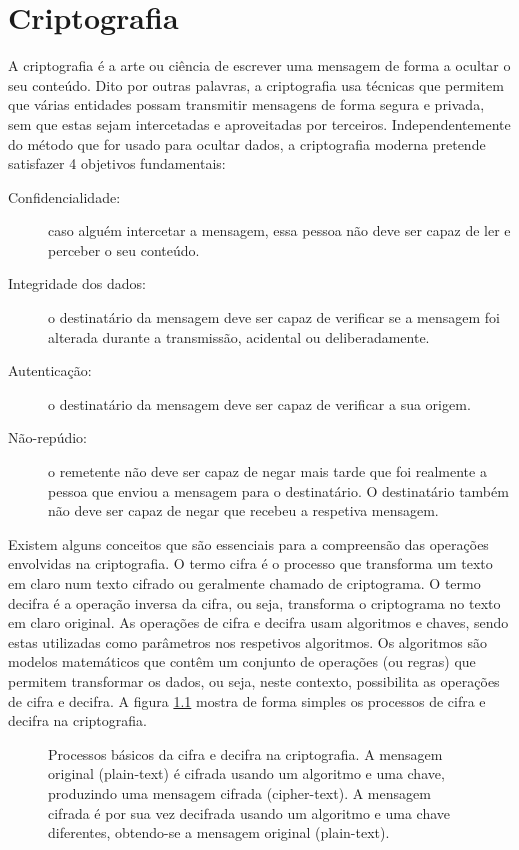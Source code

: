 \documentclass[a4paper,11pt,openright,oneside]{report}
\begin{document}
\chapter{Criptografia}
\label{chap.criptografia}

A criptografia é a arte ou ciência de escrever uma mensagem de forma a ocultar o seu conteúdo. Dito por outras palavras, a criptografia usa técnicas que permitem que várias entidades possam transmitir mensagens de forma segura e privada, sem que estas sejam intercetadas e aproveitadas por terceiros. Independentemente do método que for usado para ocultar dados, a criptografia moderna pretende satisfazer 4 objetivos fundamentais:

\begin{description}
\item[Confidencialidade:] caso alguém intercetar a mensagem, essa pessoa não deve ser capaz de ler e perceber o seu conteúdo.
\item[Integridade dos dados:] o destinatário da mensagem deve ser capaz de verificar se a mensagem foi alterada durante a transmissão, acidental ou deliberadamente.
\item[Autenticação:] o destinatário da mensagem deve ser capaz de verificar a sua origem.
\item[Não-repúdio:] o remetente não deve ser capaz de negar mais tarde que foi realmente a pessoa que enviou a mensagem para o destinatário. O destinatário também não deve ser capaz de negar que recebeu a respetiva mensagem.
\end{description}
Existem alguns conceitos que são essenciais para a compreensão das operações envolvidas na criptografia. O termo cifra é o processo que transforma um texto em claro num texto cifrado ou geralmente chamado de criptograma. O termo decifra é a operação inversa da cifra, ou seja, transforma o criptograma no texto em claro original. As operações de cifra e decifra usam algoritmos e chaves, sendo estas utilizadas como parâmetros nos respetivos algoritmos. Os algoritmos são modelos matemáticos que contêm um conjunto de operações (ou regras) que permitem transformar os dados, ou seja, neste contexto, possibilita as operações de cifra e decifra. A figura \ref{fig:crypto0} mostra de forma simples os processos de cifra e decifra na criptografia.

\begin{figure}[ht]
\center
{}
\caption{Processos básicos da cifra e decifra na criptografia. A mensagem original (plain-text) é cifrada usando um algoritmo e uma chave, produzindo uma mensagem cifrada (cipher-text). A mensagem cifrada é por sua vez decifrada usando um algoritmo e uma chave diferentes, obtendo-se a mensagem original (plain-text).}
\label{fig:crypto0}
\end{figure}
\end{document}
